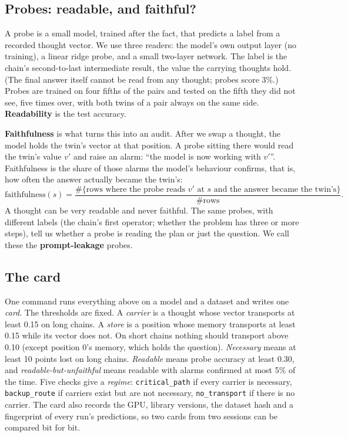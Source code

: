 \documentclass{article}
\begin{document}
\subsection{Probes: readable, and faithful?}

A probe is a small model, trained after the fact, that predicts a label from a recorded thought vector. We use three readers: the model's own output layer (no training), a linear ridge probe, and a small two-layer network. The label is the chain's second-to-last intermediate result, the value the carrying thoughts hold. (The final answer itself cannot be read from any thought; probes score 3\%.) Probes are trained on four fifths of the pairs and tested on the fifth they did not see, five times over, with both twins of a pair always on the same side. \textbf{Readability} is the test accuracy.

\textbf{Faithfulness} is what turns this into an audit. After we swap a thought, the model holds the twin's vector at that position. A probe sitting there would read the twin's value $v'$ and raise an alarm: ``the model is now working with $v'$''. Faithfulness is the share of those alarms the model's behaviour confirms, that is, how often the answer actually became the twin's:
\[
\text{faithfulness}(s) = \frac{\#\{\text{rows where the probe reads } v' \text{ at } s \text{ and the answer became the twin's}\}}{\#\text{rows}}.
\]
A thought can be very readable and never faithful. The same probes, with different labels (the chain's first operator; whether the problem has three or more steps), tell us whether a probe is reading the plan or just the question. We call these the \textbf{prompt-leakage} probes.

\subsection{The card}

One command runs everything above on a model and a dataset and writes one \emph{card}. The thresholds are fixed. A \emph{carrier} is a thought whose vector transports at least 0.15 on long chains. A \emph{store} is a position whose memory transports at least 0.15 while its vector does not. On short chains nothing should transport above 0.10 (except position 0's memory, which holds the question). \emph{Necessary} means at least 10 points lost on long chains. \emph{Readable} means probe accuracy at least 0.30, and \emph{readable-but-unfaithful} means readable with alarms confirmed at most 5\% of the time. Five checks give a \emph{regime}: \texttt{critical\_path} if every carrier is necessary, \texttt{backup\_route} if carriers exist but are not necessary, \texttt{no\_transport} if there is no carrier. The card also records the GPU, library versions, the dataset hash and a fingerprint of every run's predictions, so two cards from two sessions can be compared bit for bit.
\end{document}
